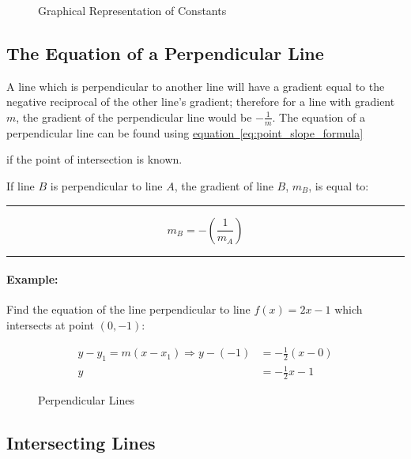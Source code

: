 \documentclass[a5paper,9pt]{book}
\theoremstyle{definition}
\newcommand{\eqlinesur}[1]{%
    \vspace*{\baselineskip}

    \hrule%

    \vspace*{\medskipamount}

    #1

    \vspace*{\medskipamount-0.5\belowdisplayskip}

    \hrule%

    \vspace*{\baselineskip}
}
\newcommand{\Rarr}{\Rightarrow}
\newcommand{\fig}[2]{%
    \hyperref[#2]{#1~\ref*{#2}}%
}
\begin{document}
        \begin{figure}[ht!]
            \centering
            
            \caption{Graphical Representation of Constants}%
            \label{fig:graphical_representation_of_constants}
        \end{figure}

        \pagebreak

        \subsection{The Equation of a Perpendicular Line}

        A line which is perpendicular to another line will have a gradient equal to
        the negative reciprocal of the other line's gradient; therefore for a line with
        gradient $m$, the gradient of the perpendicular line would be $-\frac{1}{m}$.
        The equation of a perpendicular line can be found using \fig{equation}{eq:point_slope_formula}
        if the point of intersection is known.

        If line $B$ is perpendicular to line $A$, the gradient of line $B$, $m_B$,
        is equal to:

        \eqlinesur{%
            \begin{equation}
                m_B = -\left(\frac{1}{m_A}\right)
            \end{equation}
        }

        \paragraph{Example:} Find the equation of the line perpendicular to line $f(x)=2x-1$
        which intersects at point $(0,-1)$:

        \begin{align*}
            y-y_1=m(x-x_1) \Rarr y-(-1) &= -\frac{1}{2}(x-0) \\
            y &= -\frac{1}{2}x-1
        \end{align*}

        \begin{figure}[ht]
            \centering
            
            \caption{Perpendicular Lines}
            \label{fig:perpendicular_lines}
        \end{figure}

        \subsection{Intersecting Lines}
\end{document}
